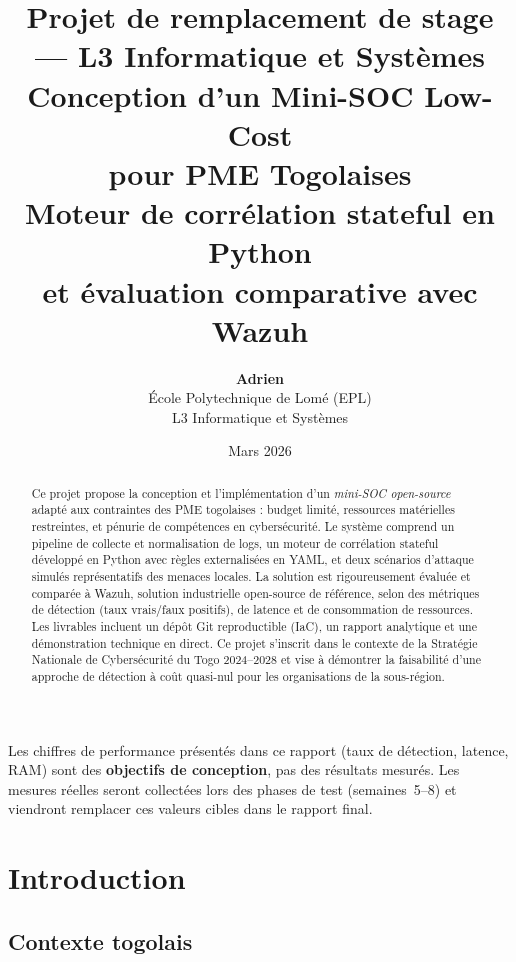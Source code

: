 \documentclass[11pt,a4paper]{article}
\title{
  {\large\color{darkgray} Projet de remplacement de stage — L3 Informatique et Systèmes}\\[0.4cm]
  {\LARGE\bfseries\color{darkblue}
    Conception d'un Mini-SOC Low-Cost\\
    pour PME Togolaises}\\[0.3cm]
  {\large\color{midblue}
    Moteur de corrélation stateful en Python\\
    et évaluation comparative avec Wazuh}
}
\author{
  \textbf{Adrien}\\
  \small École Polytechnique de Lomé (EPL)\\
  \small L3 Informatique et Systèmes
}
\date{Mars 2026}
\begin{document}

\maketitle
\thispagestyle{empty}

\begin{abstract}
\noindent
Ce projet propose la conception et l'implémentation d'un \emph{mini-SOC open-source}
adapté aux contraintes des PME togolaises : budget limité, ressources matérielles
restreintes, et pénurie de compétences en cybersécurité.
Le système comprend un pipeline de collecte et normalisation de logs,
un moteur de corrélation stateful développé en Python avec règles externalisées en YAML,
et deux scénarios d'attaque simulés représentatifs des menaces locales.
La solution est rigoureusement évaluée et comparée à Wazuh, solution industrielle
open-source de référence, selon des métriques de détection (taux vrais/faux positifs),
de latence et de consommation de ressources.
Les livrables incluent un dépôt Git reproductible (IaC), un rapport analytique
et une démonstration technique en direct.
Ce projet s'inscrit dans le contexte de la Stratégie Nationale de Cybersécurité du Togo
2024--2028 et vise à démontrer la faisabilité d'une approche de détection
à coût quasi-nul pour les organisations de la sous-région.
\end{abstract}

\vspace{0.5cm}
\begin{infobox}[title={Note méthodologique importante}]
Les chiffres de performance présentés dans ce rapport (taux de détection, latence, RAM)
sont des \textbf{objectifs de conception}, pas des résultats mesurés.
Les mesures réelles seront collectées lors des phases de test (semaines~5--8)
et viendront remplacer ces valeurs cibles dans le rapport final.
\end{infobox}

\tableofcontents
\newpage

\section{Introduction}

\subsection{Contexte togolais}
\end{document}
